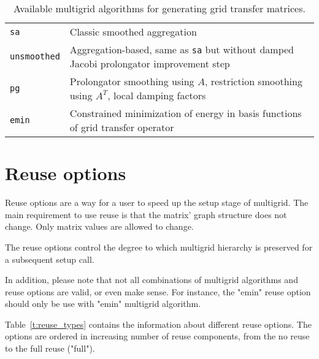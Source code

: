 \begin{table}[h!]
  \begin{center}
    \begin{tabular}{p{3.5cm} p{11cm}}
      \toprule
      \verb!sa!         & Classic smoothed aggregation~\cite{VMB1996} \\
      \verb!unsmoothed! & Aggregation-based, same as \verb!sa! but without damped Jacobi prolongator improvement step \\
      \verb!pg!         & Prolongator smoothing using $A$, restriction smoothing using $A^T$, local damping factors~\cite{ST2008} \\
      \verb!emin!       & Constrained minimization of energy in basis functions of grid transfer operator~\cite{WTWG2014,OST2011} \\
      \bottomrule
    \end{tabular}
    \caption{Available multigrid algorithms for generating grid transfer matrices. }
\label{t:mgs}
  \end{center}
\end{table}



\section{Reuse options}
\label{sec:options_reuse}

Reuse options are a way for a user to speed up the setup stage of multigrid.
The main requirement to use reuse is that the matrix' graph structure does not
change. Only matrix values are allowed to change.

The reuse options control the degree to which multigrid hierarchy is preserved
for a subsequent setup call.

In addition, please note that not all combinations of multigrid algorithms and
reuse options are valid, or even make sense. For instance, the "emin" reuse
option should only be use with "emin" multigrid algorithm.

Table~\ref{t:reuse_types} contains the information about different reuse
options. The options are ordered in increasing number of reuse components, from
the no reuse to the full reuse ("full").

